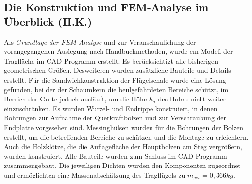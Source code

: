 \subsection{Die Konstruktion und FEM-Analyse im Überblick (H.K.)}
Als \textit{Grundlage der FEM-Analyse} und zur Veranschaulichung der vorangegangenen Auslegung nach Handbuchmethoden, wurde ein Modell der Tragfläche im CAD-Programm erstellt. Es berücksichtigt alle bisherigen geometrischen Größen. Desweiteren wurden zusätzliche Bauteile und Details erstellt. Für die Sandwichkonstruktion der Flügelschale wurde eine Lösung gefunden, bei der der Schaumkern die beulgefährdeten Bereiche schützt, im Bereich der Gurte jedoch ausläuft, um die Höhe $ h_{a} $ des Holms nicht weiter einzuschränken. Es wurden Wurzel- und Endrippe konstruiert, in denen Bohrungen zur Aufnahme der Querkraftbolzen und zur Verschraubung der Endplatte vorgesehen sind. Messinghülsen wurden für die Bohrungen der Bolzen erstellt, um die betreffenden Bereiche zu schützen und die Montage zu erleichtern. Auch die Holzklötze, die die Auflagefläche der Hauptbolzen am Steg vergrößern, wurden konstruiert. Alle Bauteile wurden zum Schluss im CAD-Programm zusammengebaut. Die jeweiligen Dichten wurden den Komponenten zugeordnet und ermöglichten eine Massenabschätzung des Tragflügels zu $ m_{ges}=0,366kg $. \\

